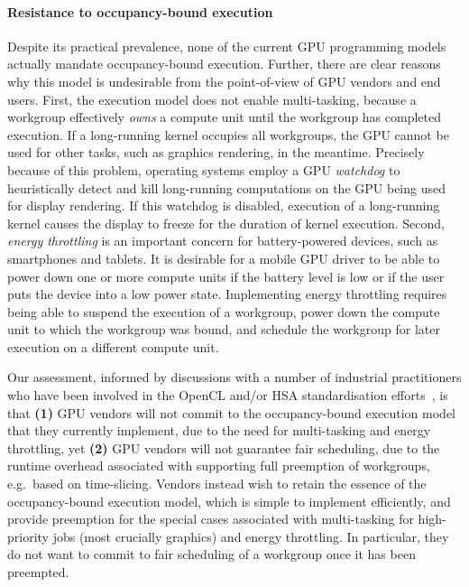 \documentclass[nocopyrightspace]{sigplanconf-pldi16}
\begin{document}
\paragraph{Resistance to occupancy-bound execution}

Despite its practical prevalence, none of the current GPU programming
models actually mandate occupancy-bound execution.  Further, there are
clear reasons why this model is undesirable from the point-of-view of
GPU vendors and end users.  First, the execution model does not enable
multi-tasking, because a workgroup effectively \emph{owns} a compute
unit until the workgroup has completed execution.  If a long-running
kernel occupies all workgroups, the GPU cannot be used for other
tasks, such as graphics rendering, in the meantime.  Precisely because
of this problem, operating systems employ a GPU \emph{watchdog} to
heuristically detect and kill long-running computations on the GPU
being used for display rendering.  If this watchdog is disabled,
execution of a long-running kernel causes the display to freeze for
the duration of kernel execution.  Second, \emph{energy throttling} is
an important concern for battery-powered devices, such as smartphones
and tablets.  It is desirable for a mobile GPU driver to be able to
power down one or more compute units if the battery level is low or if
the user puts the device into a low power state.  Implementing energy
throttling requires being able to suspend the execution of a
workgroup, power down the compute unit to which the workgroup was
bound, and schedule the workgroup for later execution on a different
compute unit.

Our assessment, informed by discussions with a number of industrial
practitioners who have been involved in the OpenCL and/or HSA
standardisation efforts~\cite{CitePersonalCommunication}, is that
\textbf{(1)} GPU vendors will not commit to the occupancy-bound
execution model that they currently implement, due to the need for
multi-tasking and energy throttling, yet \textbf{(2)} GPU vendors will
not guarantee fair scheduling, due to the runtime overhead associated
with supporting full preemption of workgroups, e.g.\ based on
time-slicing.  Vendors instead wish to retain the essence of the
occupancy-bound execution model, which is simple to implement
efficiently, and provide preemption for the special cases associated
with multi-tasking for high-priority jobs (most crucially graphics)
and energy throttling.  In particular, they do not want to commit to
fair scheduling of a workgroup once it has been preempted.
\end{document}
